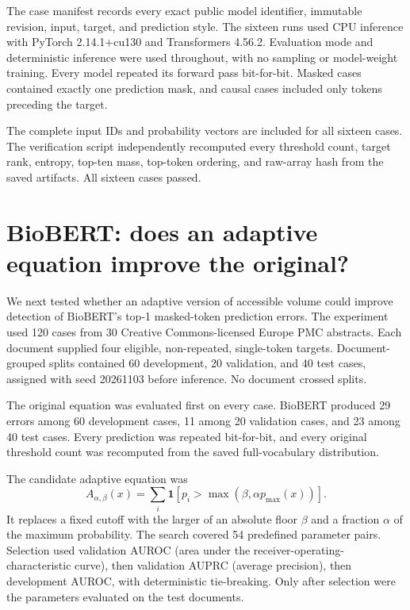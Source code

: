 \documentclass[11pt,a4paper]{article}
\begin{document}
The case manifest records every exact public model identifier, immutable revision, input, target, and prediction style. The sixteen runs used CPU inference with PyTorch 2.14.1+cu130 and Transformers 4.56.2. Evaluation mode and deterministic inference were used throughout, with no sampling or model-weight training. Every model repeated its forward pass bit-for-bit. Masked cases contained exactly one prediction mask, and causal cases included only tokens preceding the target.

The complete input IDs and probability vectors are included for all sixteen cases. The verification script independently recomputed every threshold count, target rank, entropy, top-ten mass, top-token ordering, and raw-array hash from the saved artifacts. All sixteen cases passed.

\section{BioBERT: does an adaptive equation improve the original?}
We next tested whether an adaptive version of accessible volume could improve detection of BioBERT's top-1 masked-token prediction errors. The experiment used 120 cases from 30 Creative Commons-licensed Europe PMC abstracts. Each document supplied four eligible, non-repeated, single-token targets. Document-grouped splits contained 60 development, 20 validation, and 40 test cases, assigned with seed 20261103 before inference. No document crossed splits.

The original equation was evaluated first on every case. BioBERT produced 29 errors among 60 development cases, 11 among 20 validation cases, and 23 among 40 test cases. Every prediction was repeated bit-for-bit, and every original threshold count was recomputed from the saved full-vocabulary distribution.

The candidate adaptive equation was
\begin{equation}
A_{\alpha,\beta}(x)=\sum_i\mathbf{1}\!\left[p_i>\max\!\left(\beta,\alpha p_{\max}(x)\right)\right].
\label{eq:adaptive-volume}
\end{equation}
It replaces a fixed cutoff with the larger of an absolute floor $\beta$ and a fraction $\alpha$ of the maximum probability. The search covered 54 predefined parameter pairs. Selection used validation AUROC (area under the receiver-operating-characteristic curve), then validation AUPRC (average precision), then development AUROC, with deterministic tie-breaking. Only after selection were the parameters evaluated on the test documents.
\end{document}
